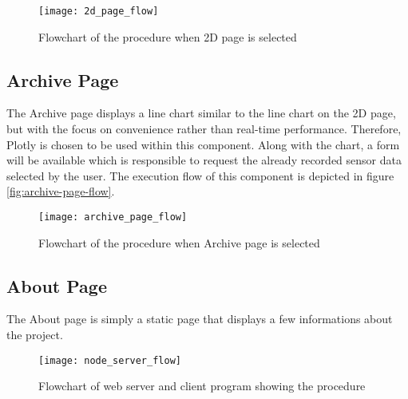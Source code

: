 \begin{figure}[H]
    \centering
    \texttt{[image: 2d\_page\_flow]}
    \caption{Flowchart of the procedure when 2D page is selected}
    \label{fig:2d-page-flow}
\end{figure}

\subsection{Archive Page}
The Archive page displays a line chart similar to the line chart on the 2D page, but with the focus on convenience rather than real-time performance. Therefore, Plotly is chosen to be used within this component. Along with the chart, a form will be available which is responsible to request the already recorded sensor data selected by the user. The execution flow of this component is depicted in figure \vref{fig:archive-page-flow}.

\begin{figure}[h]
    \centering
    \texttt{[image: archive\_page\_flow]}
    \caption{Flowchart of the procedure when Archive page is selected}
    \label{fig:archive-page-flow}
\end{figure}

\subsection{About Page}
The About page is simply a static page that displays a few informations about the project.


\begin{figure}[h]
    \centering
    \texttt{[image: node\_server\_flow]}
    \caption{Flowchart of web server and client program showing the procedure}
    \label{fig:webserver-program-flow}
\end{figure}
